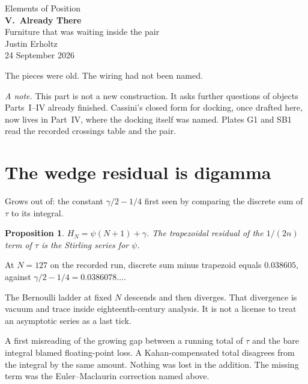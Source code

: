 \documentclass[10pt,a4paper]{article}
\theoremstyle{plain}
\newtheorem{proposition}{Proposition}
\theoremstyle{definition}
\theoremstyle{remark}
\begin{document}
\begin{center}
\vspace*{1.8em}
{\large Elements of Position}\\[1.4em]
{\LARGE\bfseries V.\ Already There}\\[0.4em]
{\small Furniture that was waiting inside the pair}\\[1.4em]
{\normalsize Justin Erholtz}\\[0.3em]
{\small 24 September 2026}
\end{center}

\vspace{1.0em}

\begin{center}
{\large The pieces were old. The wiring had not been named.}
\end{center}

\vspace{0.8em}

\noindent
\textit{A note.}
This part is not a new construction.
It asks further questions of objects Parts~I--IV already finished.
Cassini's closed form for docking, once drafted here, now lives in Part~IV, where the docking itself was named.
Plates G1 and SB1 read the recorded crossings table and the pair.

\tableofcontents

\section{The wedge residual is digamma}

Grows out of: the constant \(\gamma/2-1/4\) first seen by comparing the discrete sum of \(\tau\) to its integral.

\begin{proposition}
\(H_N=\psi(N+1)+\gamma\).
The trapezoidal residual of the \(1/(2n)\) term of \(\tau\) is the Stirling series for \(\psi\).
\end{proposition}

At \(N=127\) on the recorded run, discrete sum minus trapezoid equals \(0.038605\), against \(\gamma/2-1/4=0.0386078\ldots\).

The Bernoulli ladder at fixed \(N\) descends and then diverges.
That divergence is vacuum and trace inside eighteenth-century analysis.
It is not a license to treat an asymptotic series as a last tick.

A first misreading of the growing gap between a running total of \(\tau\) and the bare integral blamed floating-point loss.
A Kahan-compensated total disagrees from the integral by the same amount.
Nothing was lost in the addition.
The missing term was the Euler--Maclaurin correction named above.
\end{document}
